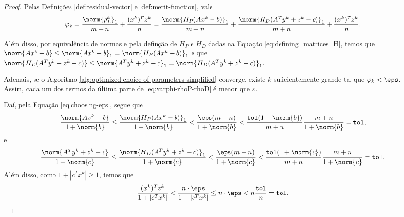 \begin{proof}
	 Pelas Definições \ref{def:residual-vector} e \ref{def:merit-function}, vale
	\begin{equation}
		\label{eq:varphi-rhoP-rhoD}
				\varphi_{k} =  \frac{\norm{\rho^{k}_L}_1}{m+n} + 
\frac{(x^{k})^Tz^{k}}{n}  = \frac{\norm{H_{P}(Ax^{k} - b)}_1}{m+n} +\frac{\norm{H_{D}(A^{T}y^{k} + z^{k}- c)}_1 }{m+n} + 
\frac{(x^{k})^Tz^{k}}{n}.
	\end{equation}

Além disso, por equivalência de normas e pela definção de $H_{P}$ e $H_{D}$ dadas na Equação \eqref{eq:defining_matrices_H}, temos que $\norm{Ax^{k} - b} \leq \norm{Ax^{k} - b}_{1} = \norm{H_{P}(Ax^{k} - b)}_{1}$ e que $\norm{H_{D}(A^{T}y^{k} + z^{k}- c)} \leq \norm{A^{T}y^{k} + z^{k}- c}_1 = \norm{H_{D}(A^{T}y^{k} + z^{k}- c)}_1$.

Ademais, se  o Algoritmo \ref{alg:optimized-choice-of-parameters-simplified} converge, existe $k$ suficientemente grande tal que $\varphi_{k}<\eps$. Assim, cada um dos termos da última parte de \eqref{eq:varphi-rhoP-rhoD} é menor que $\varepsilon$.


Daí, pela Equação \eqref{eq:choosing-eps}, segue que 
\[
\dfrac{\norm{Ax^{k} - b}}{1 + \norm{b}} \leq  \frac{\norm{H_{P}(Ax^{k} - b)}_1  }{1 + \norm{b}} < \frac{\eps (m+n)}{1 + \norm{b}} <\frac{\tol(1+\norm{b})}{m+n} \frac{m+n}{1 + \norm{b}} = \tol,
\]
e
\[
\dfrac{\norm{A^{T}y^{k} + z^{k}- c}}{1 + \norm{c}} \leq  \frac{\norm{H_{D}(A^{T}y^{k} + z^{k}- c)}_{1}  }{1 + \norm{c}} < \frac{\eps (m+n)}{1 + \norm{c}} <\frac{\tol(1+\norm{c})}{m+n} \frac{m+n}{1 + \norm{c}} = \tol.
\]
Além disso, como $1+ |c^{T}x^{k}| \geq 1$, temos que 
\[
\dfrac{(x^{k})^{T}z^{k}}{1+ |c^{T}x^{k}|} <   \frac{n\cdot  \eps}{1+ |c^{T}x^{k}|} \leq n \cdot \eps < n \frac{\tol}{n} = \tol. \qedhere
\]
 \end{proof}

